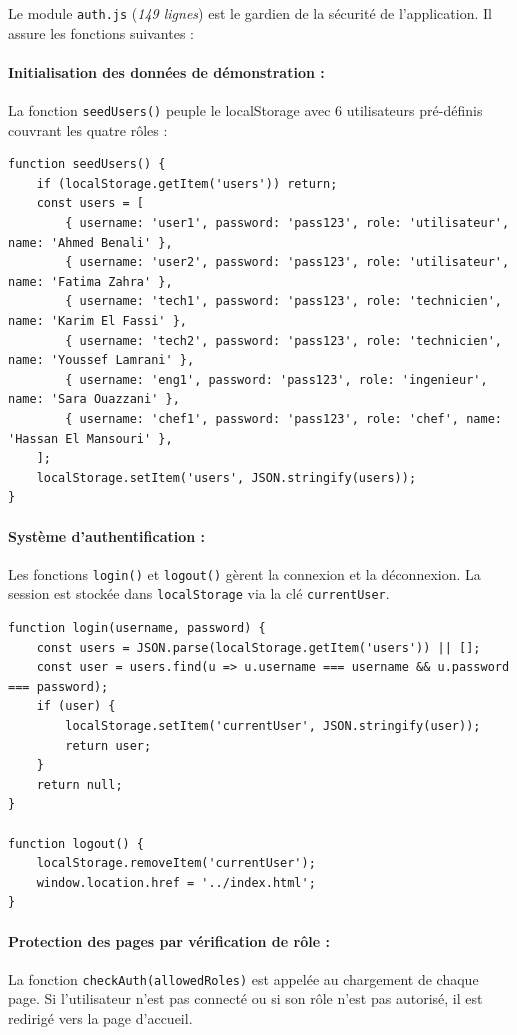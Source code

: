\documentclass[12pt,a4paper,twoside]{report}
\begin{document}
Le module \texttt{auth.js} (\textit{149 lignes}) est le gardien de la sécurité de l'application. Il assure les fonctions suivantes :

\paragraph{Initialisation des données de démonstration :}
La fonction \texttt{seedUsers()} peuple le localStorage avec 6 utilisateurs pré-définis couvrant les quatre rôles :

\begin{lstlisting}[style=jsstyle]
function seedUsers() {
    if (localStorage.getItem('users')) return;
    const users = [
        { username: 'user1', password: 'pass123', role: 'utilisateur', name: 'Ahmed Benali' },
        { username: 'user2', password: 'pass123', role: 'utilisateur', name: 'Fatima Zahra' },
        { username: 'tech1', password: 'pass123', role: 'technicien', name: 'Karim El Fassi' },
        { username: 'tech2', password: 'pass123', role: 'technicien', name: 'Youssef Lamrani' },
        { username: 'eng1', password: 'pass123', role: 'ingenieur', name: 'Sara Ouazzani' },
        { username: 'chef1', password: 'pass123', role: 'chef', name: 'Hassan El Mansouri' },
    ];
    localStorage.setItem('users', JSON.stringify(users));
}
\end{lstlisting}

\paragraph{Système d'authentification :}
Les fonctions \texttt{login()} et \texttt{logout()} gèrent la connexion et la déconnexion. La session est stockée dans \texttt{localStorage} via la clé \texttt{currentUser}.

\begin{lstlisting}[style=jsstyle]
function login(username, password) {
    const users = JSON.parse(localStorage.getItem('users')) || [];
    const user = users.find(u => u.username === username && u.password === password);
    if (user) {
        localStorage.setItem('currentUser', JSON.stringify(user));
        return user;
    }
    return null;
}

function logout() {
    localStorage.removeItem('currentUser');
    window.location.href = '../index.html';
}
\end{lstlisting}

\paragraph{Protection des pages par vérification de rôle :}
La fonction \texttt{checkAuth(allowedRoles)} est appelée au chargement de chaque page. Si l'utilisateur n'est pas connecté ou si son rôle n'est pas autorisé, il est redirigé vers la page d'accueil.
\end{document}

